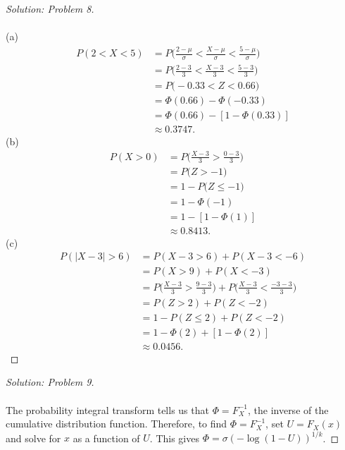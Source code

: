 \documentclass[10pt]{article}
\begin{document}
\vspace{0.2cm}
\begin{proof}[Solution: Problem 8]
\text{}\\
\text{}\\
(a)
\begin{align*}
P(2 < X < 5) &= P\bigg(\frac{2 - \mu}{\sigma} < \frac{X - \mu}{\sigma} < \frac{5  - \mu}{\sigma}\bigg)\\
&= P\bigg(\frac{2 - 3}{3} < \frac{X - 3}{3} < \frac{5  - 3}{3}\bigg)\\
&= P\bigg(-0.33 < Z < 0.66 \bigg)\\
&= \Phi(0.66) -  \Phi(-0.33)\\
&= \Phi(0.66) -  [1 - \Phi(0.33)]\\
&\approx 0.3747.
\end{align*}
(b)
\begin{align*}
P(X > 0) &= P\bigg(\frac{X - 3}{3} > \frac{0  - 3}{3}\bigg)\\
&= P\bigg(Z > -1 \bigg)\\
&= 1 - P\bigg(Z \leq -1 \bigg)\\
&= 1 - \Phi(-1)\\
&= 1 - [1 - \Phi(1)]\\
&\approx 0.8413.
\end{align*}
(c)
\begin{align*}
P(|X - 3| > 6) &= P(X - 3 > 6)  + P(X - 3 < -6) \\
&= P(X  > 9)  + P(X < -3) \\
&= P\bigg(\frac{X-3}{3}  > \frac{9-3}{3}\bigg)  + P(\frac{X-3}{3} < \frac{-3-3}{3}\bigg)\\
&= P(Z  > 2)  + P(Z < -2)\\
&= 1 - P(Z  \leq 2)  + P(Z < -2)\\
&= 1 - \Phi(2)  + [1-\Phi(2)]\\
&\approx 0.0456.
\end{align*}
\end{proof}

\begin{proof}[Solution: Problem 9]
\text{}\\
\text{}\\
The probability integral transform tells us that $\Phi = F_X^{-1}$, the inverse of the cumulative distribution function. Therefore, to find $\Phi = F_X^{-1}$, set $U = F_X(x)$ and solve for $x$ as a function of $U$. This gives $\Phi  = \sigma(-\log(1-U))^{1/k}$.
\end{proof}
\end{document}
